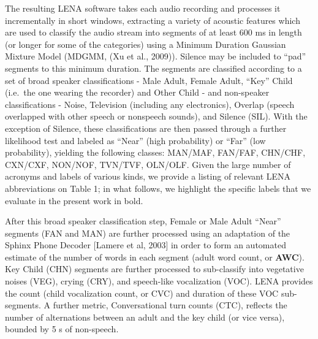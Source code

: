 \documentclass[english,floatsintext,man]{apa6}
\begin{document}
The resulting LENA software takes each audio recording and processes it
incrementally in short windows, extracting a variety of acoustic
features which are used to classify the audio stream into segments of at
least 600 ms in length (or longer for some of the categories) using a
Minimum Duration Gaussian Mixture Model (MDGMM, (Xu et al., 2009)).
Silence may be included to \enquote{pad} segments to this minimum
duration. The segments are classified according to a set of broad
speaker classifications - Male Adult, Female Adult, \enquote{Key} Child
(i.e.~the one wearing the recorder) and Other Child - and non-speaker
classifications - Noise, Television (including any electronics), Overlap
(speech overlapped with other speech or nonspeech sounds), and Silence
(SIL). With the exception of Silence, these classifications are then
passed through a further likelihood test and labeled as \enquote{Near}
(high probability) or \enquote{Far} (low probability), yielding the
following classes: MAN/MAF, FAN/FAF, CHN/CHF, CXN/CXF, NON/NOF, TVN/TVF,
OLN/OLF. Given the large number of acronyms and labels of various kinds,
we provide a listing of relevant LENA abbreviations on Table 1; in what
follows, we highlight the specific labels that we evaluate in the
present work in bold.

After this broad speaker classification step, Female or Male Adult
\enquote{Near} segments (FAN and MAN) are further processed using an
adaptation of the Sphinx Phone Decoder {[}Lamere et al, 2003{]} in order
to form an automated estimate of the number of words in each segment
(adult word count, or \textbf{AWC}). Key Child (CHN) segments are
further processed to sub-classify into vegetative noises (VEG), crying
(CRY), and speech-like vocalization (VOC). LENA provides the count
(child vocalization count, or CVC) and duration of these VOC
sub-segments. A further metric, Conversational turn counts (CTC),
reflects the number of alternations between an adult and the key child
(or vice versa), bounded by 5 s of non-speech.
\end{document}
